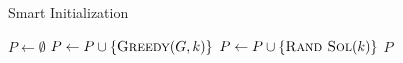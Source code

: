 \begin{algorithm}
  \caption{Smart Initialization}\label{alg:GENETIKUS-ALGORITMUS:SMART-INIT}
  \begin{algorithmic}[1]
    \State $P \leftarrow \emptyset$
    \State $P \leftarrow P \cup  \left\{ \Call{Greedy}{G, k} \right\}$
    \EndFor
    \State $P \leftarrow P \cup  \left\{ \Call{Rand Sol}{k} \right\}$
    \EndWhile
    \State \Return $P$
    \EndFunction
  \end{algorithmic}
\end{algorithm}

